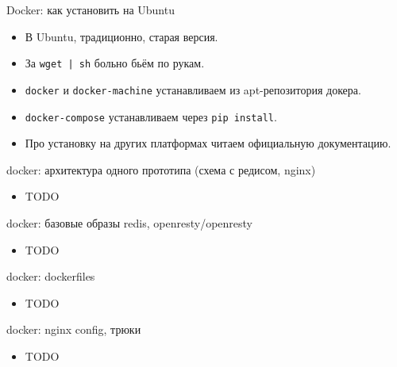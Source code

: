 \documentclass[aspectratio=169,handout,bigger]{beamer}
\begin{document}

\begin{frame}{Docker: как установить на Ubuntu}
  \begin{itemize}
    \item В Ubuntu, традиционно, старая версия.
    \item За \texttt{wget | sh} больно бьём по рукам.
    \item \texttt{docker} и \texttt{docker-machine}
          устанавливаем из apt-репозитория докера.
    \item \texttt{docker-compose} устанавливаем через \texttt{pip install}.
    \item Про установку на других платформах читаем официальную документацию.
  \end{itemize}
\end{frame}


\begin{frame}{docker: архитектура одного прототипа (схема с редисом, nginx)}
  \begin{itemize}
    \item TODO
  \end{itemize}
\end{frame}


\begin{frame}{docker: базовые образы redis, openresty/openresty}
  \begin{itemize}
    \item TODO
  \end{itemize}
\end{frame}


\begin{frame}{docker: dockerfiles}
  \begin{itemize}
    \item TODO
  \end{itemize}
\end{frame}


\begin{frame}{docker: nginx config, трюки}
  \begin{itemize}
    \item TODO
  \end{itemize}
\end{frame}
\end{document}
